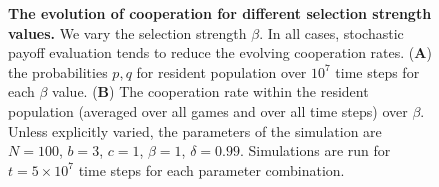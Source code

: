 \documentclass[11pt]{article}
\theoremstyle{plainCl1}
\theoremstyle{plainCl2}
\begin{document}
\begin{figure}[!htbp]
\begin{subfigure}{.35\textwidth}
  \end{subfigure}
\caption{{\bf The evolution of cooperation for different selection strength values.}
We vary the selection strength $\beta$. In all cases, stochastic payoff
evaluation tends to reduce the evolving cooperation rates. ({\bf A}) the
probabilities \(p, q\) for resident population over \(10^7\) time steps for each
\(\beta\) value. ({\bf B}) The cooperation rate within the resident population
(averaged over all games and over all time steps) over \(\beta\). Unless
explicitly varied, the parameters of the simulation are $N\!=\!100$, $b\!=\!3$,
$c\!=\!1$, $\beta\!=\!1$, $\delta\!=\!0.99$. Simulations are run for
$t\!=\!5\times 10^7$ time steps for each parameter
combination.}\label{fig:cooperation_rate_over_betas}
\end{figure}



\end{document}
